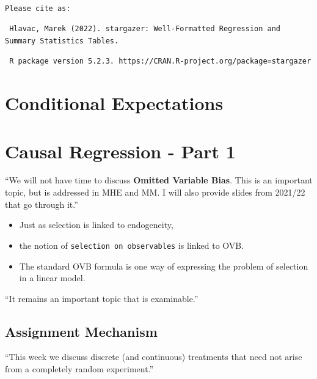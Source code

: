 \documentclass[
  letterpaper,
  DIV=11,
  numbers=noendperiod]{scrreprt}
\providecommand{\tightlist}{%
  \setlength{\itemsep}{0pt}\setlength{\parskip}{0pt}}\usepackage{longtable,booktabs,array}
\theoremstyle{definition}
\theoremstyle{remark}
\begin{document}
\begin{verbatim}

Please cite as: 
\end{verbatim}

\begin{verbatim}
 Hlavac, Marek (2022). stargazer: Well-Formatted Regression and Summary Statistics Tables.
\end{verbatim}

\begin{verbatim}
 R package version 5.2.3. https://CRAN.R-project.org/package=stargazer 
\end{verbatim}


\chapter{Conditional Expectations}\label{conditional-expectations}


\chapter{Causal Regression - Part 1}\label{causal-regression---part-1}

``We will not have time to discuss \textbf{Omitted Variable Bias}. This
is an important topic, but is addressed in MHE and MM. I will also
provide slides from 2021/22 that go through it.''

\begin{itemize}
\tightlist
\item
  Just as selection is linked to endogeneity,
\item
  the notion of \texttt{selection\ on\ observables} is linked to OVB.
\item
  The standard OVB formula is one way of expressing the problem of
  selection in a linear model.
\end{itemize}

``It remains an important topic that is examinable.''

\section{Assignment Mechanism}\label{assignment-mechanism}

``This week we discuss discrete (and continuous) treatments that need
not arise from a completely random experiment.''
\end{document}
